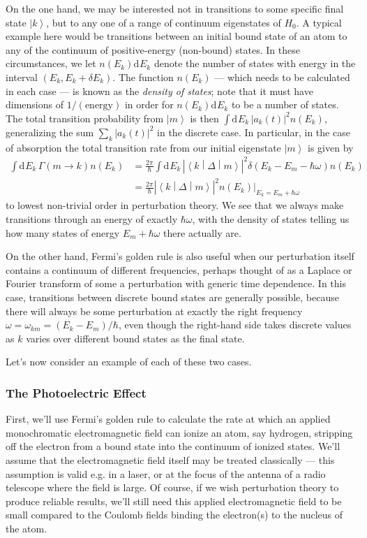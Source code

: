\documentclass{article}
\theoremstyle{plain}\theoremheaderfont{\normalfont\itshape}\theorembodyfont{\rmfamily}\theoremseparator{.}\newtheorem*{rem}{Remark}\newtheorem*{ex}{Example}\newtheorem*{proof}{Proof}\newtheorem*{altp}{Alternative proof}
\theoremstyle{plain}\theoremheaderfont{\normalfont\bfseries}\theorembodyfont{\rmfamily}\theoremseparator{.}\newtheorem{thm}{Theorem}[section]\newtheorem{lem}[thm]{Lemma}\newtheorem{prop}[thm]{Proposition}\newtheorem*{cor}{Corollary}\newtheorem{defn}[thm]{Definition}\newtheorem{clm}[thm]{Claim}\newtheorem{clminproof}{Claim}
\theoremstyle{break}\theoremheaderfont{\normalfont\itshape}\theorembodyfont{\rmfamily}\theoremseparator{.\medskip}\newtheorem*{proofskip}{Proof}\newtheorem*{exs}{Examples}\newtheorem*{rems}{Remarks}
\theoremstyle{break}\theoremheaderfont{\normalfont\bfseries}\theorembodyfont{\rmfamily}\theoremseparator{.\medskip}\newtheorem{lemskip}[thm]{Lemma}\newtheorem{defnskip}[thm]{Definition}\newtheorem{propskip}[thm]{Proposition}\newtheorem{thmskip}[thm]{Theorem}
\numberwithin{equation}{section}
\newcommand{\dd}[2][]{\mathrm{d}^{#1} #2\,}
\renewcommand{\d}[2][]{\mathrm{d}^{#1} #2}
\newcommand{\ket}[1]{\left| #1 \right\rangle}
\newcommand{\mel}[3]{\left\langle #1 \middle| #2 \middle| #3 \right\rangle}
\newcommand{\abs}[1]{\left| #1 \right|}
\begin{document}
    On the one hand, we may be interested not in transitions to some specific final state \(\ket{k}\), but to any one of a range of continuum eigenstates of \(H_0\). A typical example here would be transitions between an initial bound state of an atom to any of the continuum of positive-energy (non-bound) states. In these circumstances, we let \(n(E_k)\d{E_k}\) denote the number of states with energy in the interval \((E_k,E_k+\delta E_k)\). The function \(n(E_k)\) --- which needs to be calculated in each case --- is known as the \textit{density of states}; note that it must have dimensions of \(1/(\text{energy})\) in order for \(n(E_k)\d{E_k}\) to be a number of states. The total transition probability from \(\ket{m}\) is then \(\int\dd{E_k}\abs{a_k(t)}^2 n(E_k)\), generalizing the sum \(\sum_k \abs{a_k(t)}^2\) in the discrete case. In particular, in the case of absorption the total transition rate from our initial eigenstate \(\ket{m}\) is given by
    \begin{align}
        \int\dd{E_k}\Gamma(m\to k)n(E_k)&=\frac{2\pi}{\hbar}\int\dd{E_k}\abs{\mel{k}{\Delta}{m}}^2\delta(E_k-E_m-\hbar\omega)n(E_k)\\
        &=\frac{2\pi}{\hbar}\abs{\mel{k}{\Delta}{m}}^2\left.n(E_k)\right|_{E_k=E_m+\hbar\omega}
    \end{align}
    to lowest non-trivial order in perturbation theory. We see that we always make transitions through an energy of exactly \(\hbar\omega\), with the density of states telling us how many states of energy \(E_m+\hbar\omega\) there actually are.

    On the other hand, Fermi's golden rule is also useful when our perturbation itself contains a continuum of different frequencies, perhaps thought of as a Laplace or Fourier transform of some a perturbation with generic time dependence. In this case, transitions between discrete bound states are generally possible, because there will always be some perturbation at exactly the right frequency \(\omega=\omega_{km}=(E_k-E_m)/\hbar\), even though the right-hand side takes discrete values as \(k\) varies over different bound states as the final state.

    Let's now consider an example of each of these two cases.

    \subsubsection{The Photoelectric Effect}
    First, we'll use Fermi's golden rule to calculate the rate at which an applied monochromatic electromagnetic field can ionize an atom, say hydrogen, stripping off the electron from a bound state into the continuum of ionized states. We'll assume that the electromagnetic field itself may be treated classically --- this assumption is valid e.g. in a laser, or at the focus of the antenna of a radio telescope where the field is large. Of course, if we wish perturbation theory to produce reliable results, we'll still need this applied electromagnetic field to be small compared to the Coulomb fields binding the electron(s) to the nucleus of the atom.
\end{document}
